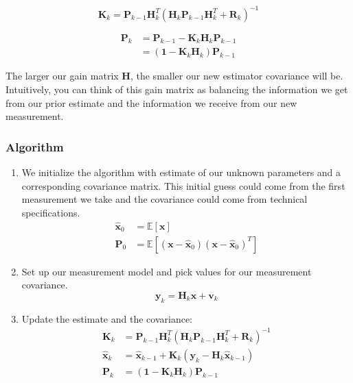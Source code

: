 \documentclass[a4paper]{article}
\begin{document}
$$\mathbf{K}_{k}=\mathbf{P}_{k-1} \mathbf{H}_{k}^{T}\left(\mathbf{H}_{k} \mathbf{P}_{k-1} \mathbf{H}_{k}^{T}+\mathbf{R}_{k}\right)^{-1}$$

$$\begin{aligned} \mathbf{P}_{k} &=\mathbf{P}_{k-1}-\mathbf{K}_{k} \mathbf{H}_{k} \mathbf{P}_{k-1} \\ &=\left(\mathbf{1}-\mathbf{K}_{k} \mathbf{H}_{k}\right) \mathbf{P}_{k-1} \end{aligned}$$

The larger our gain matrix $\mathbf{H}$, the smaller our new estimator
covariance will be. Intuitively, you can think of this gain matrix as
balancing the information we get from our prior estimate and the
information we receive from our new measurement.

\subsubsection{Algorithm}
\label{sec-3-0-1}

\begin{enumerate}
\item We initialize the algorithm with estimate of our unknown parameters
and a corresponding covariance matrix. This initial guess could come
from the first measurement we take and the covariance could come from
technical specifications.
$$\begin{aligned} \hat{\mathbf{x}}_{0} &=\mathbb{E}[\mathbf{x}] \\ \mathbf{P}_{0} &=\mathbb{E}\left[\left(\mathbf{x}-\hat{\mathbf{x}}_{0}\right)\left(\mathbf{x}-\hat{\mathbf{x}}_{0}\right)^{T}\right] \end{aligned}$$

\item Set up our measurement model and pick values for our measurement
covariance.
$$\mathbf{y}_{k}=\mathbf{H}_{k} \mathbf{x}+\mathbf{v}_{k}$$

\item Update the estimate and the covariance:
$$\begin{aligned} \mathbf{K}_{k} &=\mathbf{P}_{k-1} \mathbf{H}_{k}^{T}\left(\mathbf{H}_{k} \mathbf{P}_{k-1} \mathbf{H}_{k}^{T}+\mathbf{R}_{k}\right)^{-1} \\ \hat{\mathbf{x}}_{k} &=\hat{\mathbf{x}}_{k-1}+\mathbf{K}_{k}\left(\mathbf{y}_{k}-\mathbf{H}_{k} \hat{\mathbf{x}}_{k-1}\right) \\ \mathbf{P}_{k} &=\left(\mathbf{1}-\mathbf{K}_{k} \mathbf{H}_{k}\right) \mathbf{P}_{k-1} 
   \end{aligned}$$
\end{enumerate}
\end{document}
